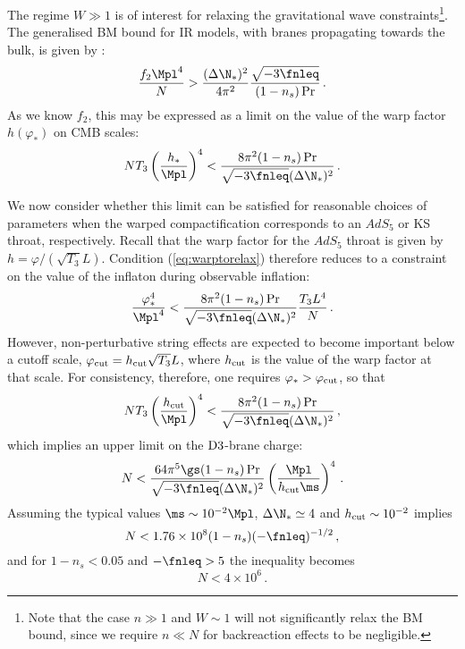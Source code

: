 The regime $W \gg 1$ is of interest for 
relaxing the gravitational wave constraints\footnote{Note that 
the case $n \gg 1$ and
$W \sim 1$ will not significantly relax the BM bound, 
since we require $n \ll N$ for backreaction effects to be negligible.}. 
The generalised BM bound for IR models, with branes propagating towards the bulk, is given by 
:
% 
\begin{equation}
\label{eq:f2IRlower-multi}
\frac{f_2\Mpl^4}{N} > \frac{(\Delta \N_*)^2}{4\pi^2}
\frac{\sqrt{-3\fnleq}}{(1-n_s)\Pr}  \,.
\end{equation}
% 
As we know $f_2$, this may be expressed as 
a limit on the value of the warp factor $h(\varphi_*)$ on CMB scales: 
% 
\begin{equation}
\label{eq:warptorelax}
N T_3 \left(\frac{h_*}{\Mpl}\right)^4 < 
\frac{8\pi^2 (1-n_s)\Pr}{\sqrt{-3\fnleq}(\Delta \N_*)^2} \,.
\end{equation}
% 


We now consider whether this limit can be satisfied for reasonable choices 
of parameters when the warped compactification corresponds to 
an $AdS_5$ or KS throat, respectively. Recall that the warp 
factor for the $AdS_5$ throat is given by $h=\varphi/(\sqrt{T_3}L)$.  
Condition (\ref{eq:warptorelax}) therefore reduces to a constraint on the 
value of the inflaton during observable inflation: 
% 
\begin{equation}
\label{eq:phivalue-dbi}
\frac{\varphi_*^4}{\Mpl^4} < 
\frac{8\pi^2 (1-n_s)\Pr}{\sqrt{-3\fnleq} ( \Delta \N_*)^2} 
\frac{T_3 L^4}{N} \,.
\end{equation}
%  
However, non-perturbative string effects are expected to become 
important below a cutoff scale, $\varphi_{\rm cut} = 
h_{\rm cut} \sqrt{T_3} L$, where $h_{\rm cut}$ is the value of the 
warp factor at that scale. For consistency, therefore, one requires 
$\varphi_*>\varphi_{\rm cut}$, so that 
% 
\begin{equation}
 N T_3 \left(\frac{h_\mathrm{cut} }{\Mpl}\right)^4 < 
\frac{8\pi^2 (1-n_s)\Pr}{\sqrt{-3\fnleq} ( \Delta \N_*)^2} \,,
\end{equation}
% 
which implies an upper limit on the 
${\rm D3}$-brane charge: 
% 
\begin{equation}
\label{eq:Nlimit-dbi}
N< \frac{64\pi^5 \gs (1-n_s)\Pr}{\sqrt{-3\fnleq} ( \Delta \N_*)^2}
\left( \frac{\Mpl}{h_{\rm cut} \ms} \right)^4   \,.
\end{equation}
% 
Assuming the typical values $\ms \sim 10^{-2}\Mpl$, 
$\Delta \N_* \simeq 4$ and 
$h_{\rm cut} \sim 10^{-2}$ implies
%   
\begin{equation}
N < 1.76 \times 10^8 (1-n_s)(-\fnleq)^{-1/2} \,, 
\end{equation}
% 
and for $1-n_s <0.05$ and $-\fnleq>5$ the inequality becomes
% 
\begin{equation}
 N < 4\times 10^6\,.
\end{equation}
%  


